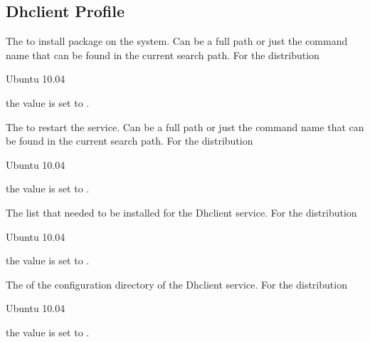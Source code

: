 \label{sec:dhclient_profile}
\subsection{Dhclient Profile}


The  to install package on the system. Can be a full path or
just the command name that can be found in the current search path. 
For the distribution
\begin{inparaitem}
\item[\TheDistribution{ubuntu}] Ubuntu 10.04
\end{inparaitem}
the value is set to .


The  to restart the service. Can be a full path or
just the command name that can be found in the current search path. 
For the distribution
\begin{inparaitem}
\item[\TheDistribution{ubuntu}] Ubuntu 10.04
\end{inparaitem}
the value is set to .


The  list that needed to be installed for the Dhclient service.
For the distribution
\begin{inparaitem}
\item[\TheDistribution{ubuntu}] Ubuntu 10.04
\end{inparaitem}
the value is set to .


The  of the configuration directory of the Dhclient service. 
For the distribution
\begin{inparaitem}
\item[\TheDistribution{ubuntu}] Ubuntu 10.04
\end{inparaitem}
the value is set to .

